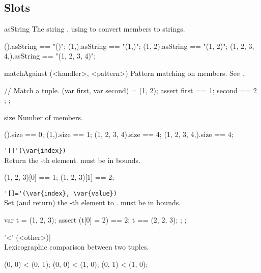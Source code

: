 \subsection{Slots}
\begin{urbiscriptapi}
\item[asString]%
  The string , using
   to convert members to strings.

\begin{urbiassert}
           ().asString == "()";
         (1,).asString == "(1,)";
       (1, 2).asString == "(1, 2)";
(1, 2, 3, 4,).asString == "(1, 2, 3, 4)";
\end{urbiassert}


\item[matchAgainst](<handler>, <pattern>)%
  Pattern matching on members.  See .
\begin{urbiscript}
{
  // Match a tuple.
  (var first, var second) = (1, 2);
  assert { first == 1; second == 2 };
};
\end{urbiscript}

\item[size] Number of members.
\begin{urbiassert}
           ().size == 0;
         (1,).size == 1;
 (1, 2, 3, 4).size == 4;
(1, 2, 3, 4,).size == 4;
\end{urbiassert}

\item \lstinline|'[]'(\var{index})|\\
  Return the -th element.   must be in bounds.
\begin{urbiassert}
(1, 2, 3)[0] == 1;
(1, 2, 3)[1] == 2;
\end{urbiassert}

\item \lstinline|'[]='(\var{index}, \var{value})|\\
  Set (and return) the -th element to .
   must be in bounds.
\begin{urbiscript}
{
  var t = (1, 2, 3);
  assert
  {
    (t[0] = 2) == 2;
    t == (2, 2, 3);
  };
};
\end{urbiscript}

\item['<'](<other>)|\\
  Lexicographic comparison between two tuples.
\begin{urbiassert}
(0, 0) < (0, 1);
(0, 0) < (1, 0);
(0, 1) < (1, 0);
\end{urbiassert}


\end{urbiscriptapi}
